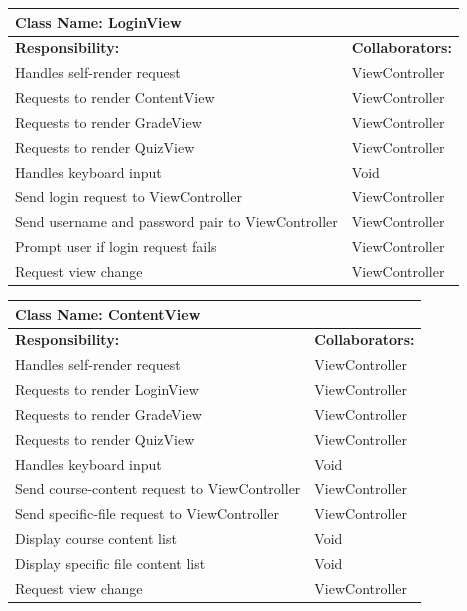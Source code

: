\documentclass[]{article}
\begin{document}
  \begin{table}[H]
		\centering
		\begin{tabular}{|p{9cm}|p{3cm}|}
		\hline
		 \multicolumn{2}{|l|}{\textbf{Class Name: LoginView}} \\
		\hline
		\textbf{Responsibility:} & \textbf{Collaborators:} \\
		\hline
    Handles self-render request & ViewController \\
    \hline
    Requests to render ContentView & ViewController \\
    \hline
    Requests to render GradeView & ViewController \\
    \hline
    Requests to render QuizView & ViewController \\
    \hline
    Handles keyboard input & Void \\
    \hline
    Send login request to ViewController & ViewController \\
    \hline
    Send username and password pair to ViewController & ViewController \\
    \hline
    Prompt user if login request fails & ViewController \\
    \hline
    Request view change & ViewController \\
    \hline
		\end{tabular}
	\end{table}

  \begin{table}[H]
		\centering
		\begin{tabular}{|p{9cm}|p{3cm}|}
		\hline
		 \multicolumn{2}{|l|}{\textbf{Class Name: ContentView}} \\
		\hline
		\textbf{Responsibility:} & \textbf{Collaborators:} \\
		\hline
    Handles self-render request & ViewController \\
    \hline
    Requests to render LoginView & ViewController \\
    \hline
    Requests to render GradeView & ViewController \\
    \hline
    Requests to render QuizView & ViewController \\
    \hline
    Handles keyboard input & Void\\
    \hline
    Send course-content request to ViewController & ViewController \\
    \hline
    Send specific-file request to ViewController & ViewController \\
    \hline
    Display course content list & Void\\
    \hline
    Display specific file content list & Void\\
    \hline
    Request view change & ViewController \\
    \hline
		\end{tabular}
	\end{table}
\end{document}
